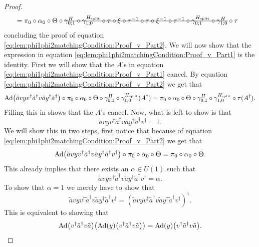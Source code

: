 \documentclass[12pt,a4paper,twoside]{article}
\numberwithin{equation}{section}
\begin{document}
\begin{proof}
\begin{align}
	&=\pi_0\circ\alpha_0\circ\Theta\circ\stkout{\gamma^{H}_{0;1}\circ\gamma^{H_{\text{split}}}_{1;0}\circ\tau\circ\xi\circ\tau^{-1}\circ\tau\circ\xi^{-1}\circ\tau^{-1}\circ\gamma^{H_{\text{split}}}_{0;1}\circ\gamma^H_{1;0}}\circ\tau
	\end{align}
	concluding the proof of equation \eqref{eq:lem:phi1phi2matchingCondition:Proof_v_Part2}. We will now show that the expression in equation \eqref{eq:lem:phi1phi2matchingCondition:Proof_v_Part1} is the identity. First we will show that the $A$'s in equation \eqref{eq:lem:phi1phi2matchingCondition:Proof_v_Part1} cancel. By equation \eqref{eq:lem:phi1phi2matchingCondition:Proof_v_Part2} we get that
	\begin{equation}
		\Ad{\tilde{a}vyv^\dagger\tilde{a}^\dagger v\tilde{a}y^\dagger\tilde{a}^\dagger}\circ\pi_0\circ\alpha_0\circ\Theta\circ\gamma^{H}_{0;1}\circ\gamma^{H_{\text{split}}}_{1;0}(A^\dagger)=\pi_0\circ\alpha_0\circ\Theta\circ\gamma^{H}_{0;1}\circ\gamma^{H_{\text{split}}}_{1;0}\circ\tau(A^\dagger).
	\end{equation}
	Filling this in shows that the $A$'s cancel. Now, what is left to show is that
	\begin{equation}
		\tilde{a}vyv^\dagger\tilde{a}^\dagger v \tilde{a}y^\dagger\tilde{a}^\dagger  v^\dagger=1.
	\end{equation}
	We will show this in two steps, first notice that because of equation \eqref{eq:lem:phi1phi2matchingCondition:Proof_v_Part2} we get that
	\begin{equation}
	\Ad{\tilde{a}vyv^\dagger\tilde{a}^\dagger v \tilde{a}y^\dagger\tilde{a}^\dagger  v^\dagger}\circ\pi_0\circ\alpha_0\circ\Theta=\pi_0\circ\alpha_0\circ\Theta.
	\end{equation}
	This already implies that there exists an $\alpha\in U(1)$ such that
	\begin{equation}
	\tilde{a}vyv^\dagger\tilde{a}^\dagger v \tilde{a}y^\dagger\tilde{a}^\dagger  v^\dagger=\alpha.
	\end{equation}
	To show that $\alpha=1$ we merely have to show that
	\begin{equation}
		\tilde{a}vyv^\dagger\tilde{a}^\dagger v \tilde{a}y^\dagger\tilde{a}^\dagger  v^\dagger=\left(\tilde{a}vyv^\dagger\tilde{a}^\dagger v \tilde{a}y^\dagger\tilde{a}^\dagger  v^\dagger\right)^\dagger.
	\end{equation}
	This is equivalent to showing that
	\begin{equation}
		\Ad{v^\dagger \tilde{a}^\dagger v\tilde{a}}\left(\Ad{y}\left(v^\dagger \tilde{a}^\dagger v \tilde{a}\right)\right)=\Ad{y}\left(v^\dagger \tilde{a}^\dagger v \tilde{a}\right).

\end{equation}
\end{proof}
\end{document}
